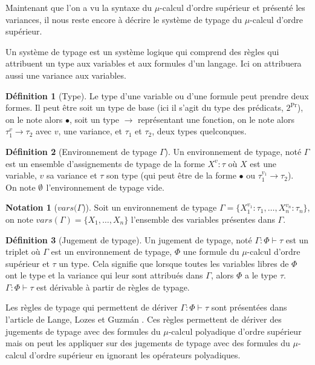 \documentclass{rapport}
\renewcommand{\emptyset}{\font\cmsy = cmsy10 at 10pt
 \hbox{\cmsy \char 59}
}
\theoremstyle{plain}
\theoremstyle{remark}
\theoremstyle{definition}
\newtheorem{notat}{Notation}
\newtheorem{dfn}{Définition}
\begin{document}
Maintenant que l'on a vu la syntaxe du $\mu$-calcul d'ordre supérieur et présenté les variances, il nous reste encore à décrire le système de typage du $\mu$-calcul d'ordre supérieur.

Un système de typage est un système logique qui comprend des règles qui attribuent un type aux variables et aux formules d'un langage. Ici on attribuera aussi une variance aux variables. 

\begin{dfn}[Type] Le type d'une variable ou d'une formule peut prendre deux formes. Il peut être soit un type de base (ici il s'agit du type des prédicats, $2^{\text{Pr}}$), on le note alors $\bullet$, soit un type $\rightarrow$ représentant une fonction, on le note alors $\tau_1^{v} \rightarrow \tau_2$ avec $v$, une variance, et $\tau_1$ et $\tau_2$, deux types quelconques. 
\end{dfn}

\begin{dfn} [Environnement de typage $\Gamma$] Un environnement de typage, noté $\Gamma$ est un ensemble d'assignements de typage de la forme ${X^v : \tau}$ où $X$ est une variable, $v$ sa variance et $\tau$ son type (qui peut être de la forme $\bullet$ ou ${\tau_1^{v_1} \rightarrow \tau_2}$). \\ 
On note $\emptyset$ l'environnement de typage vide.
\end{dfn}

\begin{notat} [$vars(\Gamma$)] Soit un environnement de typage ${\Gamma = \{X_1^{v_1} : \tau_1, \ldots, X_n^{v_n} : \tau_n\}}$, on note ${vars(\Gamma) = \{X_1, \ldots, X_n\}}$ l'ensemble des variables présentes dans $\Gamma$.
\end{notat}

\begin{dfn} [Jugement de typage] Un jugement de typage, noté ${\Gamma : \Phi \vdash \tau}$ est un triplet où $\Gamma$ est un environnement de typage, $\Phi$ une formule du $\mu$-calcul d'ordre supérieur et $\tau$ un type. Cela signifie que lorsque toutes les variables libres de $\Phi$ ont le type et la variance qui leur sont attribués dans $\Gamma$, alors $\Phi$ a le type $\tau$. ${\Gamma : \Phi \vdash \tau}$ est dérivable à partir de règles de typage.
\end{dfn}

Les règles de typage qui permettent de dériver ${\Gamma : \Phi \vdash \tau}$ sont présentées dans l'article de Lange, Lozes et Guzm{\'a}n \citep{lange2014model}. Ces règles permettent de dériver des jugements de typage avec des formules du $\mu$-calcul polyadique d'ordre supérieur mais on peut les appliquer sur des jugements de typage avec des formules du $\mu$-calcul d'ordre supérieur en ignorant les opérateurs polyadiques. 
\end{document}
